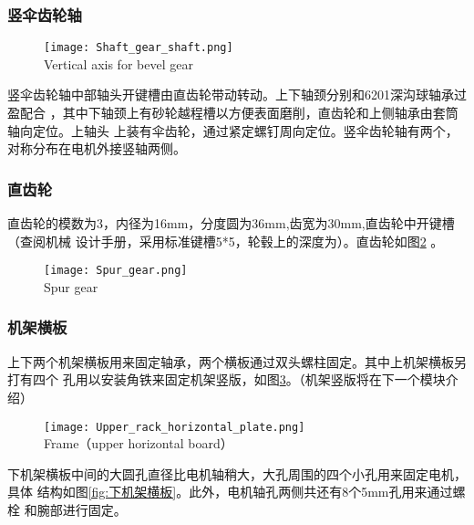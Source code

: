 \subsubsection{竖伞齿轮轴}

\begin{figure}[!htp]
  \centering
  \texttt{[image: Shaft\_gear\_shaft.png]} \\
    {Vertical axis for bevel gear}
  \label{fig:竖伞齿轮轴}
\end{figure}
竖伞齿轮轴中部轴头开键槽由直齿轮带动转动。上下轴颈分别和6201深沟球轴承过盈配合
，其中下轴颈上有砂轮越程槽以方便表面磨削，直齿轮和上侧轴承由套筒轴向定位。上轴头
上装有伞齿轮，通过紧定螺钉周向定位。竖伞齿轮轴有两个，对称分布在电机外接竖轴两侧。

\subsubsection{直齿轮}

直齿轮的模数为3，内径为16mm，分度圆为36mm,齿宽为30mm,直齿轮中开键槽（查阅机械
设计手册，采用标准键槽5*5，轮毂上的深度为）。直齿轮如图\ref{fig:直齿轮} 。

\begin{figure}[!htp]
  \centering
  \texttt{[image: Spur\_gear.png]} \\
    {Spur gear}
  \label{fig:直齿轮}
\end{figure}

\subsubsection{机架横板}

上下两个机架横板用来固定轴承，两个横板通过双头螺柱固定。其中上机架横板另打有四个
孔用以安装角铁来固定机架竖版，如图\ref{fig:上机架横板}。（机架竖版将在下一个模块介绍）
\\

\begin{figure}[!htp]
  \centering
  \texttt{[image: Upper\_rack\_horizontal\_plate.png]} \\
    {Frame（upper horizontal board）}
  \label{fig:上机架横板}
\end{figure}

下机架横板中间的大圆孔直径比电机轴稍大，大孔周围的四个小孔用来固定电机，具体
结构如图\ref{fig:下机架横板}。此外，电机轴孔两侧共还有8个5mm孔用来通过螺栓
和腕部进行固定。
\\

